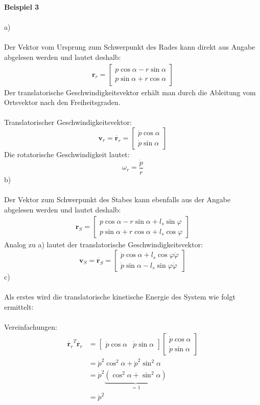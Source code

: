 \textbf{Beispiel 3} \\ \\
	a) \\ \\
	Der Vektor vom Ursprung zum Schwerpunkt des Rades kann direkt aus Angabe abgelesen werden und lautet deshalb:
	\begin{align*}
		\textbf{r}_r = \left[ \begin{matrix}
			p\cos\alpha - r\sin\alpha \\
			p\sin\alpha + r\cos\alpha
		\end{matrix}\right]
	\end{align*}
	Der translatorische Geschwindigkeitsvektor erhält man durch die Ableitung vom Ortsvektor nach den Freiheitsgraden.\\ \\
	Translatorischer Geschwindigkeitsvektor:
	\[
			\textbf{v}_r = \dot{\textbf{r}_r} = \left[\begin{matrix}
			\dot{p}\cos\alpha \\
			\dot{p}\sin\alpha
		\end{matrix}\right]
	\]
	Die rotatorische Geschwindigkeit lautet:
	\[ \omega_r = \frac{\dot{p}}{r}\]
	b)\\ \\
	Der Vektor zum Schwerpunkt des Stabes kann ebenfalls aus der Angabe abgelesen werden und lautet deshalb:
	\begin{align*}
		\textbf{r}_S = \left[\begin{matrix}
			p\cos\alpha - r\sin\alpha + l_s\sin\varphi \\
			p\sin\alpha + r\cos\alpha + l_s\cos\varphi
		\end{matrix}\right]
	\end{align*}
	Analog zu a) lautet der translatorische Geschwindigkeitsvektor:
	\[
		\textbf{v}_S = \dot{\textbf{r}_S} =\left[ \begin{matrix}
			\dot{p}\cos\alpha + l_s\cos\varphi\dot{\varphi} \\
			\dot{p}\sin\alpha - l_s\sin\varphi\dot{\varphi}
		\end{matrix}\right]
	\]
	\newpage
	\noindent
	c) \\ \\
	Als erstes wird die translatorische kinetische Energie des System wie folgt ermittelt:\\ \\
	Vereinfachungen:
	\begin{align*}
		\dot{\textbf{r}_r}^T\dot{\textbf{r}_r} &= \left[ \begin{matrix}
			\dot{p}\cos\alpha & \dot{p}\sin\alpha
		\end{matrix}\right]
		\left[\begin{matrix}
			\dot{p}\cos\alpha \\
			\dot{p}\sin\alpha
		\end{matrix}\right] \\
		&= \dot{p}^2\cos^2\alpha + \dot{p}^2\sin^2\alpha \\
		&= \dot{p}^2\underbrace{\left( \cos^2\alpha + \sin^2\alpha\right)}_{=1} \\
		&= \dot{p}^2 
	\end{align*}

